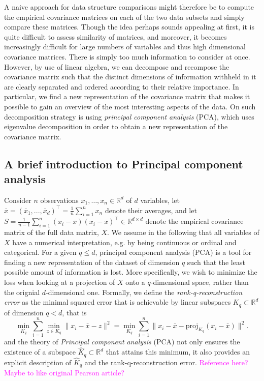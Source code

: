 \documentclass[titlepage,11pt,twoside]{article}
\newcommand{\hl}[1]{\textcolor{magenta}{#1}}
\newcommand{\RR}{\mathbb{R}}
\begin{document}
A naive approach for data structure comparisons might therefore be to compute the empirical covariance matrices on each of the two data subsets and simply compare these matrices. Though the idea perhaps sounds appealing at first, it is quite difficult to assess similarity of matrices, and moreover, it becomes increasingly difficult for large numbers of variables and thus high dimensional covariance matrices. There is simply too much information to consider at once. However, by use of linear algebra, we can decompose and recompose the covariance matrix such that the distinct dimensions of information withheld in it are clearly separated and ordered according to their relative importance. In particular, we find a new representation of the covariance matrix that makes it possible to gain an overview of the most interesting aspects of the data. On such decomposition strategy is using \textit{principal component analysis} (PCA), which uses eigenvalue decomposition in order to obtain a new representation of the covariance matrix.


\subsection{A brief introduction to Principal component analysis}
Consider $n$ observations $x_1,\dotsc,x_n \in \RR^d$ of $d$ variables, let $\bar{x} = (\bar{x}_1, ..., \bar{x}_d)^\top = \frac{1}{n} \sum_{i=1}^n x_n$ denote their averages, and let $S = \frac{1}{n-1} \sum_{i=1}^n (x_i-\bar{x}) (x_i-\bar{x})^\top \in \RR^{d \times d}$ denote the empirical covariance matrix of the full data matrix, $X$. We assume in the following that all variables of $X$ have a numerical interpretation, e.g. by being continuous or ordinal and categorical. For a given $q \leq d$, principal component analysis (PCA) is a tool for finding a new representation of the dataset of dimension $q$ such that the least possible amount of information is lost. More specifically, we wish to minimize the loss when looking at a projection of $X$ onto a $q$-dimensional space, rather than the orignial $d$-dimensional one. Formally, we define the \emph{rank-q-reconstruction error} as the minimal squared error that is achievable by linear subspaces $K_q \subset \RR^d$ of dimension $q < d$, that is
\begin{equation*}
\min_{K_q} \sum_{i=1}^n \min_{z \in K_q} \lVert x_i - \bar{x} - z \rVert^2 =
\min_{K_q} \sum_{i=1}^n \lVert x_i - \bar{x} - \text{proj}_{K_q}(x_i - \bar{x}) \rVert^2.
\end{equation*}
and the theory of \emph{Principal component analysis} (PCA) not only ensures the existence of a subspace $\hat{K}_q \subset \RR^d$ that attains this minimum, it also provides an explicit description of $\hat{K}_q$ and the rank-q-reconstruction error.  \hl{Reference here? Maybe to like original Pearson article?}
\end{document}
